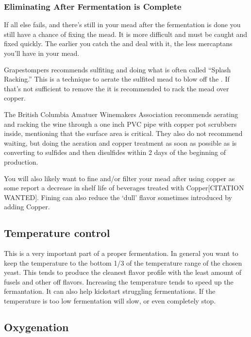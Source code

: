 \documentclass{article}
\begin{document}
  \subsubsection{Eliminating After Fermentation is Complete}
   If all else fails, and there's still  in your mead after the fermentation is done you still have a 
   chance of fixing the mead. It is more difficult and must be caught and fixed quickly. The earlier you catch 
   the  and deal with it, the less mercaptans you'll have in your mead. 

   Grapestompers\cite{grapestompers-H2S}
   recommends sulfiting and doing what is often called  ``Splash Racking.'' This is a technique to aerate the 
   sulfited mead to blow off the . If that's not sufficient to remove the  it is recommended 
   to rack the mead over copper. 

   The British Columbia Amatuer Winemakers Association\cite{bcawa-H2S} recommends
   aerating and racking the wine through a one inch PVC pipe with copper pot scrubbers inside, mentioning that 
   the surface area is critical. They also do not recommend waiting, but doing the aeration and copper treatment 
   as soon as possible as  is converting to sulfides and then disulfides within 2 days of the 
   beginning of  production.

   You will also likely want to fine and/or filter your mead after using copper as some report a decrease in 
   shelf life of beverages treated with Copper[CITATION WANTED]. Fining can also reduce the `dull' flavor
   sometimes introduced by adding Copper.

 \subsection{Temperature control}
  This is a very important part of a proper fermentation. In general you want to keep the temperature to the 
  bottom 1/3 of the temperature range of the chosen yeast. This tends to produce the cleanest flavor profile with 
  the least amount of fusels and other off flavors. Increasing the temperature tends to speed up the fermantation.
  It can also help kickstart struggling fermentations. If the temperature is too low fermentation will slow, or 
  even completely stop.

 \subsection{Oxygenation}
\end{document}
